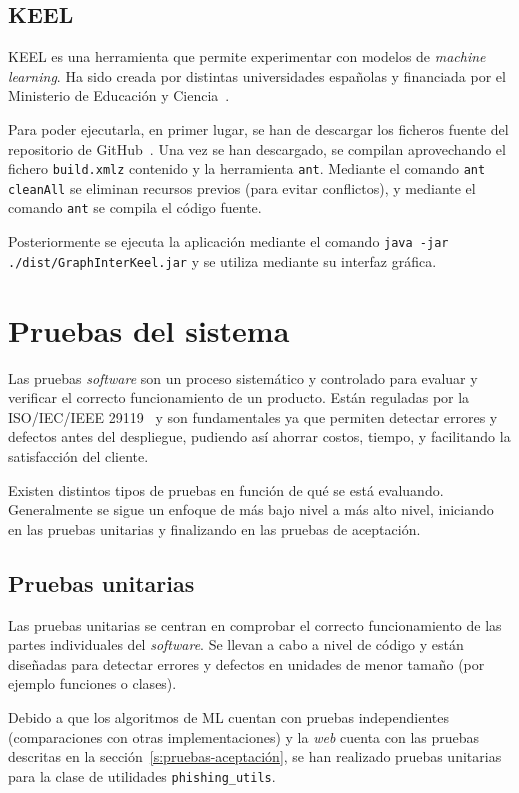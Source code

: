 \subsection{KEEL}

KEEL es una herramienta que permite experimentar con modelos de \textit{machine learning}. Ha sido creada por distintas universidades españolas y financiada por el Ministerio de Educación y Ciencia~\cite{KEEL}.

Para poder ejecutarla, en primer lugar, se han de descargar los ficheros fuente del repositorio de GitHub~\cite{keelRepo}. Una vez se han descargado, se compilan aprovechando el fichero \texttt{build.xmlz} contenido y la herramienta \texttt{ant}. Mediante el comando \texttt{ant cleanAll} se eliminan recursos previos (para evitar conflictos), y mediante el comando \texttt{ant} se compila el código fuente.

Posteriormente se ejecuta la aplicación mediante el comando \texttt{java -jar ./dist/GraphInterKeel.jar} y se utiliza mediante su interfaz gráfica.


\section{Pruebas del sistema}
\label{s:pruebas}

Las pruebas \textit{software} son un proceso sistemático y controlado para evaluar y verificar el correcto funcionamiento de un producto. Están reguladas por la ISO/IEC/IEEE 29119~\cite{iso-pruebas} y son fundamentales ya que permiten detectar errores y defectos antes del despliegue, pudiendo así ahorrar costos, tiempo, y facilitando la satisfacción del cliente.

Existen distintos tipos de pruebas en función de qué se está evaluando. Generalmente se sigue un enfoque de más bajo nivel a más alto nivel, iniciando en las pruebas unitarias y finalizando en las pruebas de aceptación.


\subsection{Pruebas unitarias}
\label{s:pruebas-unitarias}

Las pruebas unitarias se centran en comprobar el correcto funcionamiento de las partes individuales del \textit{software}. Se llevan a cabo a nivel de código y están diseñadas para detectar errores y defectos en unidades de menor tamaño (por ejemplo funciones o clases).

Debido a que los algoritmos de ML cuentan con pruebas independientes (comparaciones con otras implementaciones) y la \textit{web} cuenta con las pruebas descritas en la sección~\ref{s:pruebas-aceptación}, se han realizado pruebas unitarias para la clase de utilidades \texttt{phishing\_utils}.

